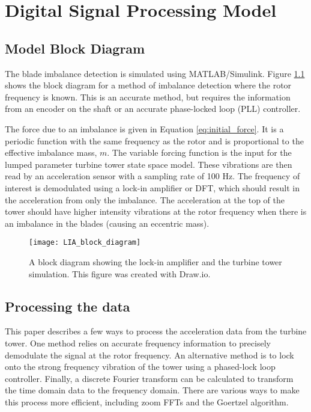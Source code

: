 \chapter{Digital Signal Processing Model} %

\label{ch_dsp_model} 

\section{Model Block Diagram}
The blade imbalance detection is simulated using MATLAB/Simulink.  Figure \ref{fig:LIA_block_diagram} shows the block diagram for a method of imbalance detection where the rotor frequency is known.  This is an accurate method, but requires the information from an encoder on the shaft or an accurate phase-locked loop (PLL) controller.  

The force due to an imbalance is given in Equation \ref{eq:initial_force}.  It is a periodic function with the same frequency as the rotor and is proportional to the effective imbalance mass, $m$.  The variable forcing function is the input for the lumped parameter turbine tower state space model. These vibrations are then read by an acceleration sensor with a sampling rate of 100 Hz.  The frequency of interest is demodulated using a lock-in amplifier or DFT, which should result in the acceleration from only the imbalance.  The acceleration at the top of the tower should have higher intensity vibrations at the rotor frequency when there is an imbalance in the blades (causing an eccentric mass).

\begin{figure}
	\centering
	\texttt{[image: LIA\_block\_diagram]}
	\decoRule
	\caption{A block diagram showing the lock-in amplifier and the turbine tower simulation.  This figure was created with Draw.io.}
	\label{fig:LIA_block_diagram}
\end{figure}


\section{Processing the data}

This paper describes a few ways to process the acceleration data from the turbine tower.  One method relies on accurate frequency information to precisely demodulate the signal at the rotor frequency.  An alternative method is to lock onto the strong frequency vibration of the tower using a phased-lock loop controller.  Finally, a discrete Fourier transform can be calculated to transform the time domain data to the frequency domain.  There are various ways to make this process more efficient, including zoom FFTs and the Goertzel algorithm.


